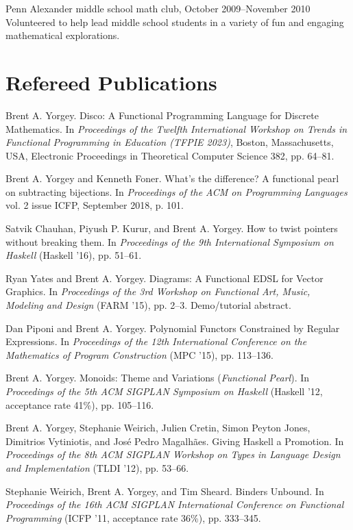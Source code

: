 \documentclass[12pt]{article}
\newcommand{\cvitem}{\par\hangpara{2em}{1}}
\begin{document}
\cvitem Penn Alexander middle school math club, October 2009--November
2010 \\
Volunteered to help lead middle school students in a variety of fun
and engaging mathematical explorations.

\section*{Refereed Publications}

\cvitem Brent A. Yorgey. Disco: A Functional Programming Language for
Discrete Mathematics. In \emph{Proceedings of the Twelfth
  International Workshop on Trends in Functional Programming in
  Education (TFPIE 2023)}, Boston, Massachusetts, USA, Electronic
  Proceedings in Theoretical Computer Science 382, pp. 64–81.

\cvitem Brent A. Yorgey and Kenneth Foner. What's the difference? A
functional pearl on subtracting bijections.  In \emph{Proceedings of
  the ACM on Programming Languages} vol. 2 issue ICFP, September 2018,
  p. 101.

\cvitem Satvik Chauhan, Piyush P. Kurur, and Brent A. Yorgey. How to
twist pointers without breaking them. In \emph{Proceedings of the 9th
  International Symposium on Haskell} (Haskell '16), pp. 51--61.

\cvitem Ryan Yates and Brent A. Yorgey. Diagrams: A Functional EDSL
for Vector Graphics. In \emph{Proceedings of the 3rd Workshop on
  Functional Art, Music, Modeling and Design} (FARM '15), pp. 2--3.
  Demo/tutorial abstract.

\cvitem Dan Piponi and Brent A. Yorgey.  Polynomial Functors
Constrained by Regular Expressions.  In \emph{Proceedings of the 12th
  International Conference on the Mathematics of Program Construction}
(MPC '15), pp. 113--136.

\cvitem Brent A. Yorgey. Monoids: Theme and Variations
(\emph{Functional Pearl}).  In \emph{Proceedings of the 5th ACM
  SIGPLAN Symposium on Haskell} (Haskell '12, acceptance rate 41\%),
pp. 105--116.

\cvitem Brent A. Yorgey, Stephanie Weirich, Julien Cretin, Simon
Peyton Jones, Dimitrios Vytiniotis, and Jos\'e Pedro
Magalh\~aes. Giving Haskell a Promotion. In \emph{Proceedings of the
  8th ACM SIGPLAN Workshop on Types in Language Design and
  Implementation} (TLDI '12), pp. 53--66.

\cvitem Stephanie Weirich, Brent A. Yorgey, and Tim Sheard. Binders
Unbound. In \emph{Proceedings of the 16th ACM SIGPLAN International
  Conference on Functional Programming} (ICFP '11, acceptance rate
  36\%), pp. 333--345.
\end{document}
